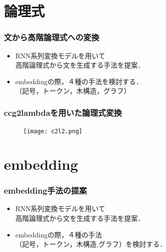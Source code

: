 \documentclass[dvipdfmx]{beamer}
\begin{document}
\section{論理式}
\begin{frame}
\frametitle{文から高階論理式への変換}
\begin{center}
\end{center}

\begin{itemize}
  \item RNN系列変換モデルを用いて\\{\color{berry}高階論理式}から文を生成する手法を提案．
  \item embeddingの際，４種の手法を検討する．\\（記号，トークン，木構造，グラフ）　
\end{itemize}

\end{frame}


\begin{frame}
\frametitle{ccg2lambdaを用いた論理式変換}
\begin{center}
\begin{figure}[h]
	\texttt{[image: c2l2.png]}
        \label{fig:c2l}
\end{figure}
\end{center}

\end{frame}




\section{embedding}
\begin{frame}
\frametitle{embedding手法の提案}
\begin{center}
\end{center}
\begin{itemize}
  \item RNN系列変換モデルを用いて\\高階論理式から文を生成する手法を提案．
  \item embeddingの際，４種の手法\\{\color{berry}（記号，トークン，木構造,グラフ）}を検討する．
\end{itemize}

\end{frame}
\end{document}
